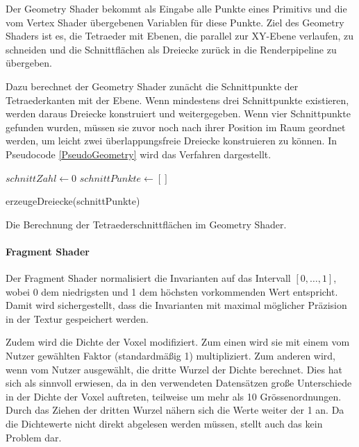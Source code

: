 \documentclass[a4paper,fontsize=12pt,toc=bib,halfparskip]{scrartcl}
\begin{document}
Der Geometry Shader bekommt als Eingabe alle Punkte eines Primitivs und die vom Vertex Shader \"ubergebenen Variablen f\"ur diese Punkte. Ziel des Geometry Shaders ist es, die Tetraeder mit Ebenen, die parallel zur XY-Ebene verlaufen, zu schneiden und die Schnittfl\"achen als Dreiecke zur\"uck in die Renderpipeline zu \"ubergeben.

Dazu berechnet der Geometry Shader zun\"acht die Schnittpunkte der Tetraederkanten mit der Ebene. Wenn mindestens drei Schnittpunkte existieren, werden  daraus Dreiecke konstruiert und weitergegeben. Wenn vier Schnittpunkte gefunden wurden, m\"ussen sie zuvor noch nach ihrer Position im Raum geordnet werden, um leicht zwei \"uberlappungsfreie Dreiecke konstruieren zu k\"onnen. In Pseudocode \ref{PseudoGeometry} wird das Verfahren dargestellt.

\begin{algorithm}
	$schnittZahl \gets 0$\;
	$schnittPunkte \gets []$\;
	
	erzeugeDreiecke(schnittPunkte)\;
	\vspace{0.5cm}
	\caption{Die Berechnung der Tetraederschnittfl\"achen im Geometry Shader.}
	\label{PseudoGeometry}
\end{algorithm}

\paragraph{Fragment Shader}
Der Fragment Shader normalisiert die Invarianten auf das Intervall $[0,\dots,1]$, wobei 0 dem niedrigsten und 1 dem h\"ochsten vorkommenden Wert entspricht. Damit wird sichergestellt, dass die Invarianten mit maximal m\"oglicher Pr\"azision in der Textur gespeichert werden.

Zudem wird die Dichte der Voxel modifiziert. Zum einen wird sie mit einem vom Nutzer gew\"ahlten Faktor (standardm\"a{\ss}ig 1) multipliziert. Zum anderen wird, wenn vom Nutzer ausgew\"ahlt, die dritte Wurzel der Dichte berechnet. Dies hat sich als sinnvoll erwiesen, da in den verwendeten Datens\"atzen gro{\ss}e Unterschiede in der Dichte der Voxel auftreten, teilweise um mehr als 10 Gr\"o{ss}enordnungen. Durch das Ziehen der dritten Wurzel n\"ahern sich die Werte weiter der 1 an. Da die Dichtewerte nicht direkt abgelesen werden m\"ussen, stellt auch das kein Problem dar. 
\end{document}
